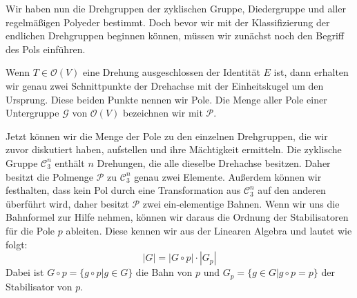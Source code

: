 Wir haben nun die Drehgruppen der zyklischen Gruppe, Diedergruppe und aller regelmäßigen Polyeder bestimmt. Doch bevor wir mit der Klassifizierung der endlichen Drehgruppen beginnen können, müssen wir zunächst noch den Begriff des Pols einführen.

\begin{defi}[Pole]
	Wenn $T \in \mathcal{O}(V)$ eine Drehung ausgeschlossen der Identität $E$ ist, dann erhalten wir genau zwei Schnittpunkte der Drehachse mit der Einheitskugel um den Ursprung. Diese beiden Punkte nennen wir Pole. Die Menge aller Pole einer Untergruppe $\mathcal{G}$ von $\mathcal{O}(V)$ bezeichnen wir mit $\mathcal{P}$.
\end{defi}

Jetzt können wir die Menge der Pole zu den einzelnen Drehgruppen, die wir zuvor diskutiert haben, aufstellen und ihre Mächtigkeit ermitteln. Die zyklische Gruppe $\mathcal{C}^n_3$ enthält $n$ Drehungen, die alle dieselbe Drehachse besitzen. Daher besitzt die Polmenge $\mathcal{P}$ zu $\mathcal{C}^n_3$ genau zwei Elemente. Außerdem können wir festhalten, dass kein Pol durch eine Transformation aus $\mathcal{C}^n_3$ auf den anderen überführt wird, daher besitzt $\mathcal{P}$ zwei ein-elementige Bahnen. Wenn wir uns die Bahnformel zur Hilfe nehmen, können wir daraus die Ordnung der Stabilisatoren für die Pole $p$ ableiten. Diese kennen wir aus der Linearen Algebra und lautet wie folgt:
$$ |G| = |G \circ p| \cdot |G_p| $$
Dabei ist $G \circ p = \{g \circ p | g \in G\}$ die Bahn von $p$ und $G_p = \{g \in G | g \circ p = p \}$ der Stabilisator von $p$.

